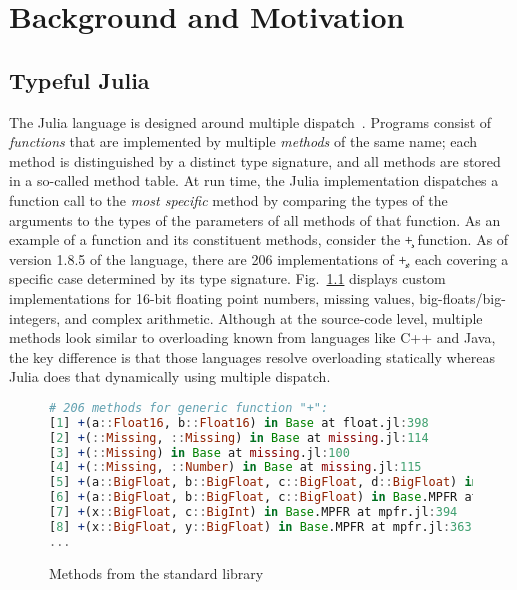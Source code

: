 
\lstset{language=julia}

\chapter{Background and Motivation}
\label{chap:back}

\section{Typeful Julia}%
\label{sec:julia-back}

The Julia language is designed around multiple dispatch~\cite{BezansonEKS17}.
Programs consist of \emph{functions} that are implemented by multiple
\emph{methods} of the same name; each method is distinguished by a distinct type
signature, and all methods are stored in a so-called method table.
At run time, the Julia implementation dispatches a function call to
the \emph{most specific} method by comparing the types of the arguments to the
types of the parameters of all methods of that function. As an example of a
function and its constituent methods, consider the \c{+} function. 
As of version 1.8.5 of the
language, there are 206 implementations of \c{+}, each covering a
specific case determined by its type signature. Fig.~\ref{plus} displays custom
implementations for 16-bit floating point numbers, missing values,
big-floats/big-integers, and complex arithmetic.
Although at the source-code level, multiple methods look similar to
overloading known from languages like C++ and Java, the key difference is that
those languages resolve overloading statically whereas Julia does that
dynamically using multiple dispatch.

\begin{figure}
\begin{lstlisting}[language=julia]
# 206 methods for generic function "+":
[1] +(a::Float16, b::Float16) in Base at float.jl:398
[2] +(::Missing, ::Missing) in Base at missing.jl:114
[3] +(::Missing) in Base at missing.jl:100
[4] +(::Missing, ::Number) in Base at missing.jl:115
[5] +(a::BigFloat, b::BigFloat, c::BigFloat, d::BigFloat) in Base.MPFR at mpfr.jl:541
[6] +(a::BigFloat, b::BigFloat, c::BigFloat) in Base.MPFR at mpfr.jl:535
[7] +(x::BigFloat, c::BigInt) in Base.MPFR at mpfr.jl:394
[8] +(x::BigFloat, y::BigFloat) in Base.MPFR at mpfr.jl:363
...
\end{lstlisting}
\caption{Methods from the standard library}\label{plus}
\end{figure}

